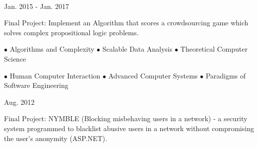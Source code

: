 \\
\begin{cventries}
  \cventry
    {} %
    {} %
    {Jan. 2015 - Jan. 2017} %
    {} %
    {
      \begin{cvitemsForEducation} %
        \item {Final Project: Implement an Algorithm that scores a crowdsourcing game which solves complex propositional logic problems.}
        \item[] {$\bullet$ Algorithms and Complexity $\bullet$ Scalable Data Analysis $\bullet$ Theoretical Computer Science}
        \item[] {$\bullet$ Human Computer Interaction $\bullet$ Advanced Computer Systems  $\bullet$ Paradigms of Software Engineering} 
      \end{cvitemsForEducation}
    }
\end{cventries}
\begin{cventries}
    
  \cventry
    {} %
    {} %
    {Aug. 2012} %
    {} %
    {
    	\begin{cvitemsForEducation}
    	    \item {Final Project:  NYMBLE (Blocking misbehaving users in a network) -  a security system programmed to blacklist abusive users in a network without compromising the user’s anonymity (ASP.NET). }
	    \end{cvitemsForEducation}
    }
\end{cventries}
